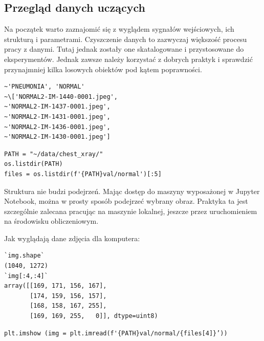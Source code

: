 \documentclass[12pt,a4paper,twoside,titlepage,openright]{book}
\begin{document}
\subsection{Przegląd danych uczących}
Na początek warto zaznajomić się z wyglądem sygnałów wejściowych, ich strukturą i parametrami. Czyszczenie danych to zazwyczaj większość procesu pracy z danymi. Tutaj jednak zostały one skatalogowane i przystosowane do eksperymentów. Jednak zawsze należy korzystać z dobrych praktyk i sprawdzić przynajmniej kilka losowych obiektów pod kątem poprawności.

\noindent
\begin{minipage}{\linewidth}
\begin{lstlisting}[caption=Podgląd danych, label=lst:test]
~'PNEUMONIA', 'NORMAL'
~\['NORMAL2-IM-1440-0001.jpeg',
~'NORMAL2-IM-1437-0001.jpeg',
~'NORMAL2-IM-1431-0001.jpeg',
~'NORMAL2-IM-1436-0001.jpeg',
~'NORMAL2-IM-1430-0001.jpeg']
\end{lstlisting}
\end{minipage}

\noindent
\begin{minipage}{\linewidth}
\begin{lstlisting}[caption=Wyświetlenie struktury danych, label=lst:test]
PATH = "~/data/chest_xray/"
os.listdir(PATH)
files = os.listdir(f'{PATH}val/normal')[:5]
\end{lstlisting}
\end{minipage}

Struktura nie budzi podejrzeń. Mając dostęp do maszyny wyposażonej w Jupyter Notebook, można w prosty sposób podejrzeć wybrany obraz. Praktyka ta jest szczególnie zalecana pracując na maszynie lokalnej, jeszcze przez uruchomieniem na środowisku obliczeniowym.

Jak wyglądają dane zdjęcia dla komputera:

\noindent
\begin{minipage}{\linewidth}
\begin{lstlisting}[caption=Struktura obrazu w formie macierzy, label=lst:test]
`img.shape`
(1040, 1272)
`img[:4,:4]`
array([[169, 171, 156, 167],
       [174, 159, 156, 157],
       [168, 158, 167, 255],
       [169, 169, 255,   0]], dtype=uint8)
\end{lstlisting}
\end{minipage}

\noindent
\begin{minipage}{\linewidth}
\begin{lstlisting}[caption=Wyświetlenie obrazu w środowisku graficznym, label=lst:test]
plt.imshow (img = plt.imread(f'{PATH}val/normal/{files[4]}’))
\end{lstlisting}
\end{minipage}
\end{document}
